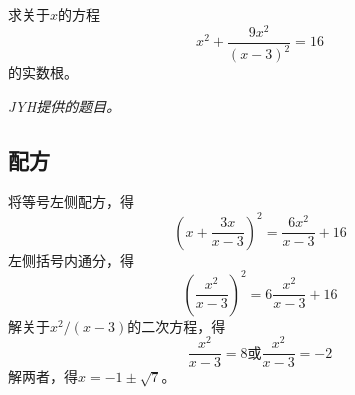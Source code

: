 

求关于$x$的方程
\[ x^2 + \frac{9x^2}{(x - 3)^2} = 16 \]
的实数根。

\textit{JYH提供的题目。}


\subsection{配方}

将等号左侧配方，得
\[ \left(x + \frac{3x}{x - 3}\right)^2 = \frac{6x^2}{x - 3} + 16 \]
左侧括号内通分，得
\[ \left(\frac{x^2}{x - 3}\right)^2 = 6\frac{x^2}{x - 3} + 16 \]
解关于$x^2/(x - 3)$的二次方程，得
\[ \frac{x^2}{x - 3} = 8 \text{或} \frac{x^2}{x - 3} = -2 \]
解两者，得$x = -1 \pm \sqrt7$。
